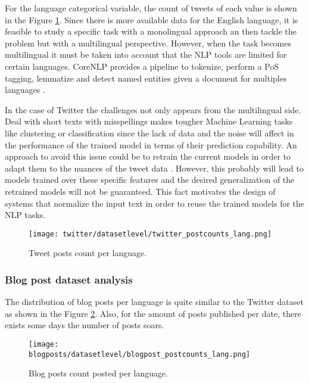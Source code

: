 \par For the language categorical variable, the count of tweets of each value is shown in the Figure \ref{fig:twitter_postcounts_lang}. Since there is more available data for the English language, it is feasible to study a specific task with a monolingual approach an then tackle the problem but with a multilingual perspective. However, when the task becomes multilingual it must be taken into account that the NLP tools are limited for certain languages. CoreNLP provides a pipeline to tokenize, perform a PoS tagging, lemmatize and detect named entities given a document for multiples languages \citep{coreNlp}. 
\par In the case of Twitter the challenges not only appears from the multilingual side. Deal with short texts with misspellings makes tougher Machine Learning tasks like clustering or classification since the lack of data and the noise will affect in the performance of the trained model in terms of their prediction capability. An approach to avoid this issue could be to retrain the current models in order to adapt them to the nuances of the tweet data \citep{synthesisLecturesSocial}. However, this probably will lead to models trained over these specific features and the desired generalization of the retrained models will not be guaranteed. This fact motivates the design of systems that normalize the input text in order to reuse the trained models for the NLP tasks.
\begin{figure}[H]
	\begin{center}
		\texttt{[image: twitter/datasetlevel/twitter\_postcounts\_lang.png]}
		\caption{Tweet posts count per language.}
		\label{fig:twitter_postcounts_lang}
	\end{center}
\end{figure}
\subsubsection{Blog post dataset analysis}
The distribution of blog posts per language is quite similar to the Twitter dataset as shown in the Figure \ref{fig:blogpost_postcounts_lang}. Also, for the amount of posts published per date, there exists some days the number of posts soars.
\begin{figure}[H]
	\begin{center}
		\texttt{[image: blogposts/datasetlevel/blogpost\_postcounts\_lang.png]}
		\caption{Blog posts count posted per language.}
		\label{fig:blogpost_postcounts_lang}
	\end{center}
\end{figure}

